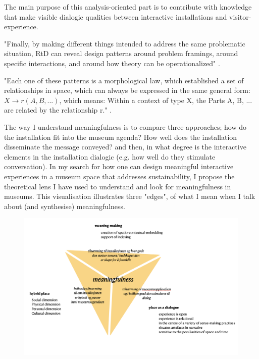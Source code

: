 The main purpose of this analysis-oriented part is to contribute with knowledge that make visible dialogic qualities between interactive installations and visitor-experience. 

"Finally, by making different things intended to address the same problematic situation, RtD can reveal design patterns \autocite{Alexander_book} around problem framings, around specific interactions, and around how theory can be operationalized" \autocite[p. 178]{zimmerman_research_2014}.


"Each one of these patterns is a morphological law, which established a set of relationships in space, which can always be expressed in the same general form: $X \rightarrow r (A, B, ...)$, which means: Within a context of type X, the Parts A, B, ... are related by the relationship r." \autocite[p. 90]{Alexander_book}.


The way I understand meaningfulness is to compare three approaches; how do the installation fit into the museum agenda? How well does the installation disseminate the message conveyed? and then, in what degree is the interactive elements in the installation dialogic (e.g. how well do they stimulate conversation). In my search for how one can design meaningful interactive experiences in a museum space that addresses sustainability, I propose the theoretical lens I have used to understand and look for meaningfulness in museums. This visualisation illustrates three "edges", of what I mean when I talk about (and synthesise) meaningfulness. 


\begin{figure}[h]
\centering 
\includegraphics[width=13cm]{pictures/meaningfullness_triangle.png}
\caption{}
\end{figure}


